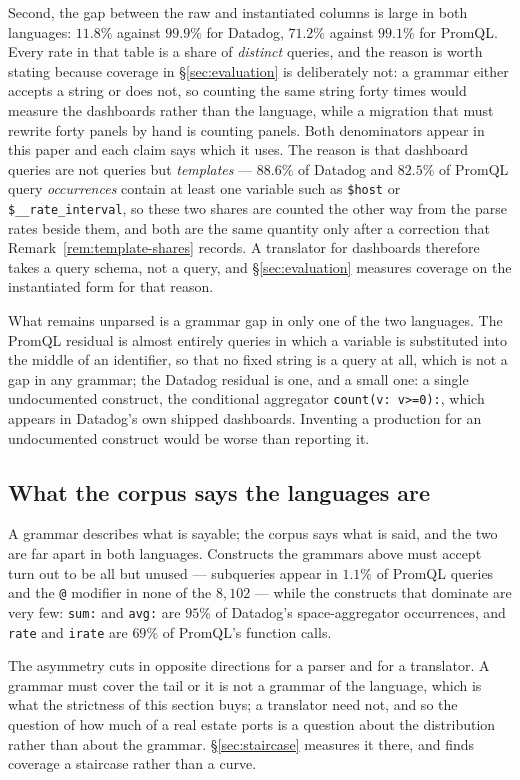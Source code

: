 Second, the gap between the raw and instantiated columns is large in both languages:
$11.8\%$ against $99.9\%$ for Datadog, $71.2\%$ against $99.1\%$ for PromQL. Every rate
in that table is a share of \emph{distinct} queries, and the reason is worth stating
because coverage in \S\ref{sec:evaluation} is deliberately not: a grammar either accepts
a string or does not, so counting the same string forty times would measure the
dashboards rather than the language, while a migration that must rewrite forty panels
by hand is counting panels. Both denominators appear in this paper and each claim says
which it uses. The reason
is that dashboard queries are not queries but \emph{templates} --- $88.6\%$ of Datadog and
$82.5\%$ of PromQL query \emph{occurrences} contain at least one variable such as
\texttt{\$host} or \texttt{\$\_\_rate\_interval}, so these two shares are counted the
other way from the parse rates beside them, and both are the same quantity only after a
correction that Remark~\ref{rem:template-shares} records. A translator for dashboards therefore takes a query
schema, not a query, and \S\ref{sec:evaluation} measures coverage on the instantiated
form for that reason.

\iffull\fi

What remains unparsed is a grammar gap in only one of the two languages. The PromQL
residual is almost entirely queries in which a variable is substituted into the middle of
an identifier, so that no fixed string is a query at all, which is not a gap in any
grammar; the Datadog residual is one, and a small one: a single undocumented construct,
the conditional aggregator \texttt{count(v: v>=0):}, which appears in Datadog's own
shipped dashboards. Inventing a production for an undocumented construct would be worse
than reporting it.

\subsection{What the corpus says the languages are}

A grammar describes what is sayable; the corpus says what is said, and the two are far
apart in both languages. Constructs the grammars above must accept turn out to be all
but unused --- subqueries appear in $1.1\%$ of PromQL queries and the \texttt{@}
modifier in none of the $8{,}102$ --- while the constructs that dominate are very few:
\texttt{sum:} and \texttt{avg:} are $95\%$ of Datadog's space-aggregator occurrences,
and \texttt{rate} and \texttt{irate} are $69\%$ of PromQL's function calls.

The asymmetry cuts in opposite directions for a parser and for a translator. A grammar
must cover the tail or it is not a grammar of the language, which is what the strictness
of this section buys; a translator need not, and so the question of how much of a real
estate ports is a question about the distribution rather than about the grammar.
\S\ref{sec:staircase} measures it there, and finds coverage a staircase rather
than a curve.

